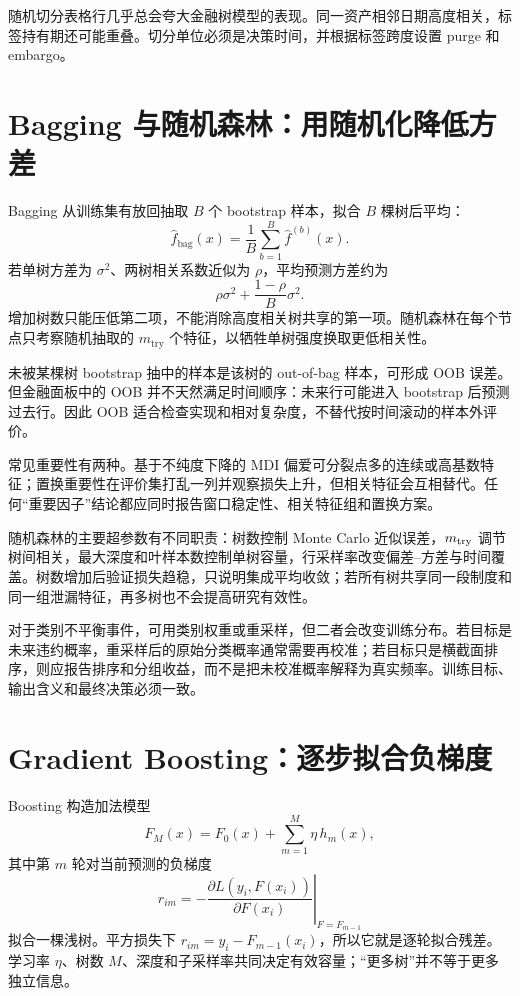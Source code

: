 \begin{diagnostic}
随机切分表格行几乎总会夸大金融树模型的表现。同一资产相邻日期高度相关，标签持有期还可能重叠。切分单位必须是决策时间，并根据标签跨度设置 purge 和 embargo。
\end{diagnostic}

\section{Bagging 与随机森林：用随机化降低方差}

Bagging 从训练集有放回抽取 $B$ 个 bootstrap 样本，拟合 $B$ 棵树后平均：
\[
\hat f_{\mathrm{bag}}(x)=\frac1B\sum_{b=1}^B\hat f^{(b)}(x).
\]
若单树方差为 $\sigma^2$、两树相关系数近似为 $\rho$，平均预测方差约为
\[
\rho\sigma^2+\frac{1-\rho}{B}\sigma^2.
\]
增加树数只能压低第二项，不能消除高度相关树共享的第一项。随机森林在每个节点只考察随机抽取的 $m_{\mathrm{try}}$ 个特征，以牺牲单树强度换取更低相关性\cite{breiman2001random}。



未被某棵树 bootstrap 抽中的样本是该树的 out-of-bag 样本，可形成 OOB 误差。但金融面板中的 OOB 并不天然满足时间顺序：未来行可能进入 bootstrap 后预测过去行。因此 OOB 适合检查实现和相对复杂度，不替代按时间滚动的样本外评价。

常见重要性有两种。基于不纯度下降的 MDI 偏爱可分裂点多的连续或高基数特征；置换重要性在评价集打乱一列并观察损失上升，但相关特征会互相替代。任何“重要因子”结论都应同时报告窗口稳定性、相关特征组和置换方案。

随机森林的主要超参数有不同职责：树数控制 Monte Carlo 近似误差，$m_{\rm try}$ 调节树间相关，最大深度和叶样本数控制单树容量，行采样率改变偏差--方差与时间覆盖。树数增加后验证损失趋稳，只说明集成平均收敛；若所有树共享同一段制度和同一组泄漏特征，再多树也不会提高研究有效性。

对于类别不平衡事件，可用类别权重或重采样，但二者会改变训练分布。若目标是未来违约概率，重采样后的原始分类概率通常需要再校准；若目标只是横截面排序，则应报告排序和分组收益，而不是把未校准概率解释为真实频率。训练目标、输出含义和最终决策必须一致。

\section{Gradient Boosting：逐步拟合负梯度}

Boosting 构造加法模型
\[
F_M(x)=F_0(x)+\sum_{m=1}^M\eta\,h_m(x),
\]
其中第 $m$ 轮对当前预测的负梯度
\[
r_{im}=-\left.\frac{\partial L(y_i,F(x_i))}{\partial F(x_i)}\right|_{F=F_{m-1}}
\]
拟合一棵浅树。平方损失下 $r_{im}=y_i-F_{m-1}(x_i)$，所以它就是逐轮拟合残差。学习率 $\eta$、树数 $M$、深度和子采样率共同决定有效容量；“更多树”并不等于更多独立信息\cite{friedman2001greedy}。

